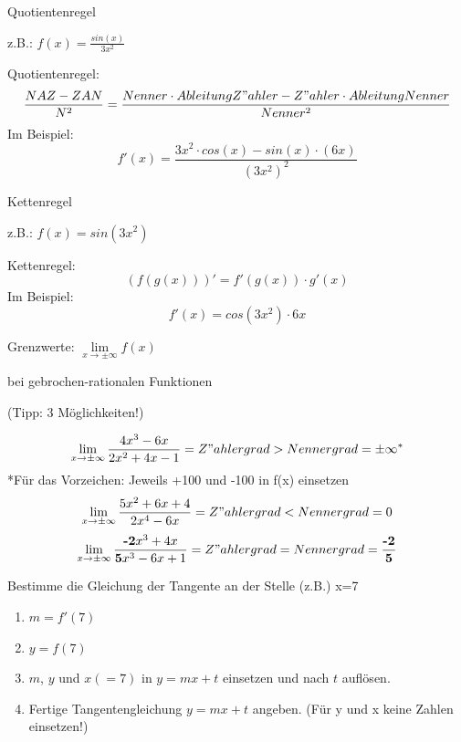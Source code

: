 \documentclass[paper=a6,landscape,ngerman,twoside=true,fontsize=12pt]{scrartcl}
\begin{document}
\begin{frage}
	Quotientenregel
	
	z.B.: $f(x)=\frac{sin(x)}{3x^2}$
	
\end{frage}
\begin{antwort}
	Quotientenregel:
	\normalsize
	\[
	\frac{NAZ-ZAN}{N^2}=\frac{Nenner \cdot AbleitungZ{"a}hler-Z{"a}hler \cdot AbleitungNenner}{Nenner^2}
	\]
	\Large
	Im Beispiel:
	\[
	f'(x)=\frac{3x^2 \cdot cos(x) - sin(x) \cdot (6x)}{(3x^2)^2}
	\]
\end{antwort}
\begin{frage}
	Kettenregel
	
	z.B.: $f(x)={sin(3x^2)}$
	
\end{frage}
\begin{antwort}
	Kettenregel:
	\[
	(f(g(x)))'=f'(g(x))\cdot g'(x)
	\]
	Im Beispiel:
	\[
	f'(x)=cos(3x^2)\cdot 6x
	\]
\end{antwort}
\begin{frage}
	Grenzwerte: $\lim\limits_{x \rightarrow \pm\infty}{f(x)}$
	\bigskip
	
	bei gebrochen-rationalen Funktionen
	
	(Tipp: 3 Möglichkeiten!)
	
\end{frage}
\begin{antwort}
	\large
	\[
	\lim\limits_{x \rightarrow \pm\infty}{\frac{4x^3 - 6x}{2x^2+4x-1}}=Z{"a}hlergrad>Nennergrad=\pm\infty^*
	\]
	\footnotesize 
	*Für das Vorzeichen: Jeweils +100 und -100 in f(x) einsetzen
	\large
	\[
	\lim\limits_{x \rightarrow \pm\infty}{\frac{5x^2+6x+4}{2x^4-6x}}=Z{"a}hlergrad<Nennergrad=0
	\]
	\[
	\lim\limits_{x \rightarrow \pm\infty}{\frac{\textbf{-2}x^3+4x}{\textbf{5}x^3 - 6x+1}}=Z{"a}hlergrad=Nennergrad=\frac{\textbf{-2}}{\textbf{5}}
	\]
\end{antwort}
\begin{frage}
	Bestimme die Gleichung der Tangente an der Stelle (z.B.) x=7
\end{frage}
\begin{antwort}
	\begin{enumerate}
		\item $m=f'(7)$
		\item $y=f(7)$
		\item $m$, $y$ und $x(=7)$ in $y= mx+t$ einsetzen und nach $t$ auflösen.
		\item Fertige Tangentengleichung $y= mx+t$ angeben. (Für y und x keine Zahlen einsetzen!)
		
	\end{enumerate}
\end{antwort}
\end{document}
